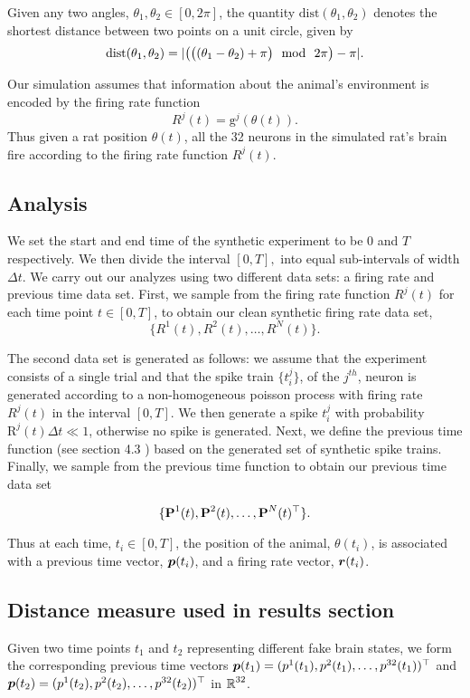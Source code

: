 Given any two angles, $\theta_{1}, \theta_{2} \in [0, 2\pi]$, the quantity
$\text{dist}(\theta_{1}, \theta_{2})$ denotes the shortest distance between 
two points on a unit circle, given by
\[
\text{dist}(\theta_{1}, \theta_{2}) = \abs{\big( \big( (\theta_{1} - \theta_{2}) + \pi  \big) \ \ \text{mod} \ \ 2\pi \big) - \pi}.
\]

Our simulation assumes  that information about the animal's environment is  encoded by the firing rate function
$$R^{j}(t) =  \text{g}^{j}(\theta(t)).$$
Thus given a rat position $\theta(t)$, all the 32  neurons  in the simulated rat's brain fire according to the firing rate function  $R^{j}(t).$


\subsection{Analysis}
We set the start  and end time of the synthetic experiment  to be  $0$ and $T$ respectively. We then divide the interval
$[0, T],$ into equal sub-intervals  of width $\Delta t$.
We carry out  our analyzes  using two different data sets:  a firing rate and  previous time data set.
First, we sample from the firing rate function  $R^{j}(t)$ for each time point $t \in [0, T]$,
to obtain our clean synthetic firing rate data  set,
$$\{R^{1}(t),  R^{2}(t),    \ldots , R^{N}(t) \}. $$

The second data set is generated as follows: we assume that the experiment consists of a single trial and that the spike train  $\{ t^j_i \}$, of the $j^{th}$, neuron is generated according to a non-homogeneous poisson process with firing rate  $R^{j}(t) $ in the interval $[0, T].$ We then generate a spike  $t^j_i$ with probability $\text{R}^{j}(t)\Delta t \ll 1$, otherwise no spike is generated.  Next, we define the previous time function (see section 4.3 )  based on the  generated set of synthetic spike trains.  Finally, we sample from the previous time function to obtain our previous time data set

$$
\{ \textbf{P}^{1}(t), \textbf{P}^{2}(t), \ldots, \textbf{P}^{N}(t)^{\top}   \}.
$$


Thus at each time, $t_{i} \in [0,T]$, the position of the animal, $\theta(t_{i})$, is associated with a previous time vector, $\boldsymbol{p}(t_{i})$, and a firing rate vector, $\boldsymbol{r}(t_{i})$.




\subsection{Distance measure used in results section}
Given two time points $t_{1}$ and $t_{2}$ representing different fake brain states, we form the corresponding previous time vectors $\boldsymbol{p}(t_{1})= (p^{1}(t_{1}), p^{2}(t_{1}), \ldots, p^{32}(t_{1}))^{\top} $  and  $\boldsymbol{p}(t_{2}) = (p^{1}(t_{2}), p^{2}(t_{2}), \ldots, p^{32}(t_{2}))^{\top}$ in $\operatorname{\mathbb{R}}^{32}$.

